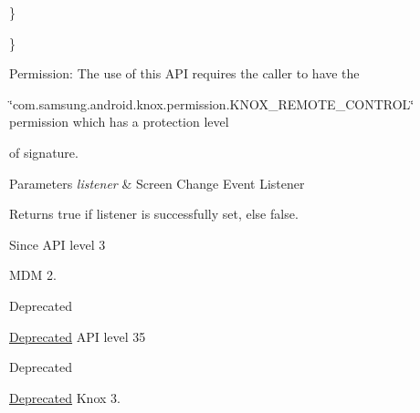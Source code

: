 \begin{DoxyPre}     \}\end{DoxyPre}



\begin{DoxyPre}  \}\end{DoxyPre}



\begin{DoxyPre} \end{DoxyPre}


\begin{DoxyParagraph}{\-Permission\-: }
\-The use of this \-A\-P\-I requires the caller to have the
\end{DoxyParagraph}
\char`\"{}com.\-samsung.\-android.\-knox.\-permission.\-K\-N\-O\-X\-\_\-\-R\-E\-M\-O\-T\-E\-\_\-\-C\-O\-N\-T\-R\-O\-L\char`\"{} permission which has a protection level

of signature.


\begin{DoxyParams}{\-Parameters}
{\em listener} & \-Screen \-Change \-Event \-Listener\\
\hline
\end{DoxyParams}
\begin{DoxyReturn}{\-Returns}
{\ttfamily true} if listener is successfully set, else {\ttfamily false}.
\end{DoxyReturn}
\begin{DoxySince}{\-Since}
\-A\-P\-I level 3

\-M\-D\-M 2.
\end{DoxySince}
\begin{DoxyRefDesc}{\-Deprecated}
\item[\hyperlink{deprecated__deprecated000026}{\-Deprecated}]\-A\-P\-I level 35\end{DoxyRefDesc}


\begin{DoxyRefDesc}{\-Deprecated}
\item[\hyperlink{deprecated__deprecated000027}{\-Deprecated}]\-Knox 3.\end{DoxyRefDesc}


